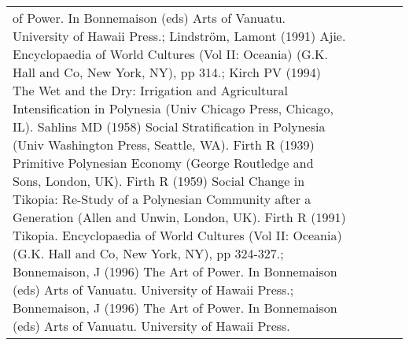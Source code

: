 \begin{longtable}{p{2cm}p{2cm}p{2cm}p{5cm}p{7cm}}
of Power. In Bonnemaison (eds) Arts of Vanuatu. University of Hawaii Press.; Lindström, Lamont (1991) Ajie. Encyclopaedia of World Cultures (Vol II: Oceania) (G.K. Hall and Co, New York, NY), pp 314.; Kirch PV (1994) The Wet and the Dry: Irrigation and Agricultural Intensification in Polynesia (Univ Chicago Press, Chicago, IL). Sahlins MD (1958) Social Stratification in Polynesia (Univ Washington Press, Seattle, WA). Firth R (1939) Primitive Polynesian Economy (George Routledge and Sons, London, UK). Firth R (1959) Social Change in Tikopia: Re-Study of a Polynesian Community after a Generation (Allen and Unwin, London, UK). Firth R (1991) Tikopia. Encyclopaedia of World Cultures (Vol II: Oceania) (G.K. Hall and Co, New York, NY), pp 324-327.; Bonnemaison, J (1996) The Art of Power. In Bonnemaison (eds) Arts of Vanuatu. University of Hawaii Press.; Bonnemaison, J (1996) The Art of Power. In Bonnemaison (eds) Arts of Vanuatu. University of Hawaii Press. \\ 

\end{longtable}
